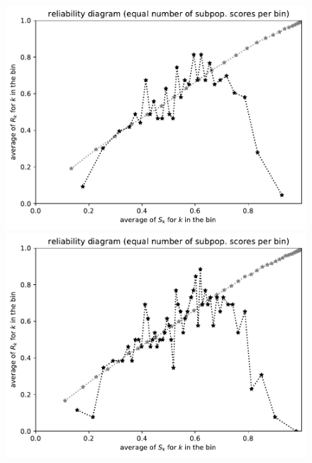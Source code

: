 \documentclass{article}
\begin{document}
\begin{figure}
\begin{centering}
\parbox{\imsize}{\includegraphics[width=\imsize]
                {./codes/unweighted/prob-1-248-Eskimo-dog-huskyequisamps30}}
\quad\quad
\parbox{\imsize}{\includegraphics[width=\imsize]
                {./codes/unweighted/prob-1-248-Eskimo-dog-huskyequisamps50}}

\vspace{\vertsep}


\end{centering}
\end{figure}
\end{document}
